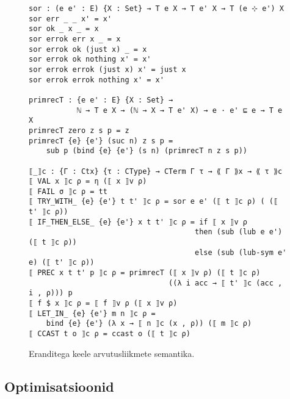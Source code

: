 \documentclass[a4paper,12pt]{article}
\begin{document}
\begin{figure}
  \begin{BVerbatim}
sor : (e e' : E) {X : Set} → T e X → T e' X → T (e ⊹ e') X
sor err _ _ x' = x'
sor ok _ x _ = x
sor errok err x _ = x
sor errok ok (just x) _ = x
sor errok ok nothing x' = x'
sor errok errok (just x) x' = just x
sor errok errok nothing x' = x'

primrecT : {e e' : E} {X : Set} →
           ℕ → T e X → (ℕ → X → T e' X) → e · e' ⊑ e → T e X
primrecT zero z s p = z
primrecT {e} {e'} (suc n) z s p =
    sub p (bind {e} {e'} (s n) (primrecT n z s p))

⟦_⟧c : {Γ : Ctx} {τ : CType} → CTerm Γ τ → ⟪ Γ ⟫x → ⟪ τ ⟫c
⟦ VAL x ⟧c ρ = η (⟦ x ⟧v ρ)
⟦ FAIL σ ⟧c ρ = tt
⟦ TRY_WITH_ {e} {e'} t t' ⟧c ρ = sor e e' (⟦ t ⟧c ρ) ( (⟦ t' ⟧c ρ))
⟦ IF_THEN_ELSE_ {e} {e'} x t t' ⟧c ρ = if ⟦ x ⟧v ρ
                                      then (sub (lub e e') (⟦ t ⟧c ρ))
                                      else (sub (lub-sym e' e) (⟦ t' ⟧c ρ))
⟦ PREC x t t' p ⟧c ρ = primrecT (⟦ x ⟧v ρ) (⟦ t ⟧c ρ)
                                ((λ i acc → ⟦ t' ⟧c (acc , i , ρ))) p
⟦ f $ x ⟧c ρ = ⟦ f ⟧v ρ (⟦ x ⟧v ρ)
⟦ LET_IN_ {e} {e'} m n ⟧c ρ =
    bind {e} {e'} (λ x → ⟦ n ⟧c (x , ρ)) (⟦ m ⟧c ρ)
⟦ CCAST t o ⟧c ρ = ccast o (⟦ t ⟧c ρ)
  \end{BVerbatim}
  \caption{Eranditega keele arvutusliikmete semantika.}
  \label{fig:exc.cterm-semantics}
\end{figure}

\subsection{Optimisatsioonid}\label{ssec:exc.optimizations}
\end{document}
